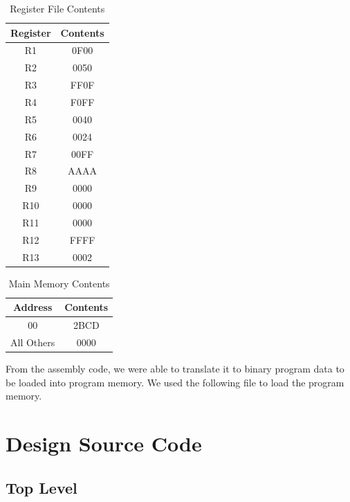 	\begin{table}[htbp]
	   \caption{Register File Contents}
	   \label{regfi}
	   \centering
	   \begin{tabular}{ c | c }
	   Register         & Contents    \\
	   \hline
	   R1  &   0F00        \\
       R2  &   0050        \\
       R3  &   FF0F        \\
       R4  &   F0FF        \\
       R5  &   0040        \\
       R6  &   0024        \\
       R7  &   00FF        \\
       R8  &   AAAA        \\
       R9  &   0000        \\
       R10 &   0000        \\
       R11 &   0000        \\
       R12 &   FFFF        \\
       R13 &   0002        \\
	   \end{tabular}
	\end{table}
    \begin{table}[htbp]
       \caption{Main Memory Contents}
       \label{mainme}
       \centering
       \begin{tabular}{ c | c }
       Address         & Contents    \\
       \hline
       00  &   2BCD        \\
       All Others  &   0000        \\
       
       \end{tabular}
    \end{table}
    
    From the assembly code, we were able to translate it to binary program data 
    to be loaded into program memory. We used the following file to load the program memory.
    
	

    \section{Design Source Code}
        \subsection{Top Level}
        
        
